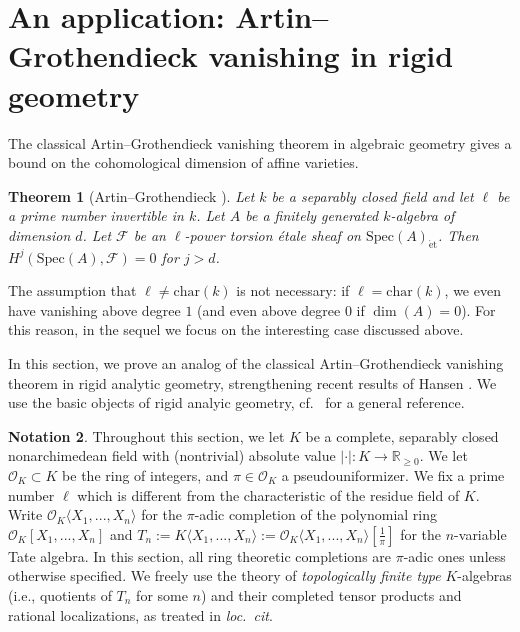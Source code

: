 \documentclass[reqno]{amsart}
\newcommand{\sF}{\mathcal{F}}
\newcommand{\spec}{\mathrm{Spec}}
\newcommand{\et}{\mathrm{\acute{e}t}}
\newtheorem{theorem}{Theorem}[section]
\theoremstyle{definition}
\newtheorem{notation}[theorem]{Notation}
\begin{document}
\newpage

\section{An application: Artin--Grothendieck vanishing in rigid geometry}


The classical Artin--Grothendieck vanishing theorem in algebraic geometry gives a bound on the cohomological dimension of affine varieties.


\begin{theorem}[{Artin--Grothendieck \cite[Cor.~3.2, Exp.~XIV]{SGA4}}] 
Let $k$ be a separably closed field and let $\ell$ be a prime number invertible in $k$.
Let $A $ be a finitely generated $k$-algebra of dimension
$d$. Let $\sF$ be an $\ell$-power torsion \'etale sheaf on $\spec(A)_{\et}$. Then $H^j(\spec(A), \sF) = 0$ for $j > d$.
\end{theorem} 

The assumption that $\ell \neq \mathrm{char}(k)$ is not
necessary: if $\ell= \mathrm{char}(k)$, we even have vanishing above degree $1$
(and even above degree $0$ if $\dim(A) = 0$). For this reason, in the sequel we focus on the interesting case discussed above.

In this section, we prove an analog of the classical Artin--Grothendieck
vanishing theorem in rigid analytic geometry, strengthening recent results of
Hansen \cite{HansenArtin}. We use the  basic objects of rigid analyic geometry, 
 cf.~\cite[Ch.~6--7]{BGR} for a general reference. 

\renewcommand{\O}{\mathcal{O}}

\begin{notation}
Throughout this section, we  let $K$ be a  complete, separably closed
nonarchimedean field with (nontrivial) absolute value $|\cdot|\colon  K \to
\mathbb{R}_{\geq 0}$. We let $\O_K \subset K$ be the ring of integers, and $\pi
\in \mathcal{O}_K$ a pseudouniformizer. We fix a prime number $\ell$ which is
different from the characteristic of the residue field of $K$. Write
$\mathcal{O}_K \langle X_1,...,X_n \rangle$ for the $\pi$-adic completion of the
polynomial ring $\mathcal{O}_K[X_1,...,X_n]$ and $T_n := K \langle X_1,...,X_n \rangle := \mathcal{O}_K \langle X_1,...,X_n \rangle[\frac{1}{\pi}]$
for the $n$-variable Tate algebra. 
In this section, all ring theoretic completions are $\pi$-adic ones unless otherwise specified.
We freely use the theory of \emph{topologically finite type} $K$-algebras (i.e.,
quotients of $T_n$ for some $n$) and their
completed tensor products and 
rational localizations, as treated in \emph{loc.~cit}. 
\end{notation}
\end{document}

